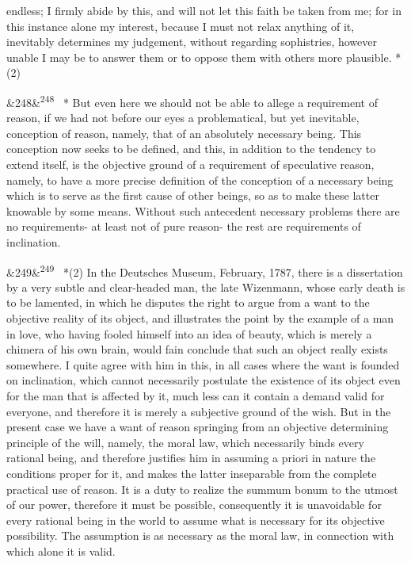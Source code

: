 \documentclass[12pt]{article}
\newcommand{\para}[1][]{\par\noindent\ifx&#1&\else\textsuperscript{\footnotesize #1}~\fi}
\begin{document}
endless; I firmly abide by this, and will not let this faith be taken from me; for in this instance alone my interest, because I must not relax anything of it, inevitably determines my judgement, without regarding sophistries, however unable I may be to answer them or to oppose them with others more plausible. *(2)

\para[248] * But even here we should not be able to allege a requirement of reason, if we had not before our eyes a problematical, but yet inevitable, conception of reason, namely, that of an absolutely necessary being. This conception now seeks to be defined, and this, in addition to the tendency to extend itself, is the objective ground of a requirement of speculative reason, namely, to have a more precise definition of the conception of a necessary being which is to serve as the first cause of other beings, so as to make these latter knowable by some means. Without such antecedent necessary problems there are no requirements- at least not of pure reason- the rest are requirements of inclination.

\para[249] *(2) In the Deutsches Museum, February, 1787, there is a dissertation by a very subtle and clear-headed man, the late Wizenmann, whose early death is to be lamented, in which he disputes the right to argue from a want to the objective reality of its object, and illustrates the point by the example of a man in love, who having fooled himself into an idea of beauty, which is merely a chimera of his own brain, would fain conclude that such an object really exists somewhere. I quite agree with him in this, in all cases where the want is founded on inclination, which cannot necessarily postulate the existence of its object even for the man that is affected by it, much less can it contain a demand valid for everyone, and therefore it is merely a subjective ground of the wish. But in the present case we have a want of reason springing from an objective determining principle of the will, namely, the moral law, which necessarily binds every rational being, and therefore justifies him in assuming a priori in nature the conditions proper for it, and makes the latter inseparable from the complete practical use of reason. It is a duty to realize the summum bonum to the utmost of our power, therefore it must be possible, consequently it is unavoidable for every rational being in the world to assume what is necessary for its objective possibility. The assumption is as necessary as the moral law, in connection with which alone it is valid.
\end{document}
